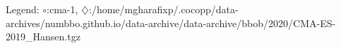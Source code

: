 Legend: {\color{NavyBlue}$\circ$}:cma-1, {\color{Magenta}$\diamondsuit$}:/home/mgharafixp/.cocopp/data-archives/numbbo.github.io/data-archive/data-archive/bbob/2020/CMA-ES-2019\_Hansen.tgz